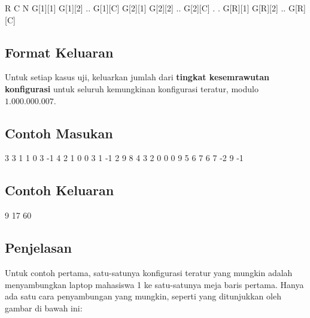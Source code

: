 \documentclass[../main_problemset.tex]{subfiles} %
\begin{document}
\begin{lcverbatim}
R C N
G[1][1] G[1][2] .. G[1][C]
G[2][1] G[2][2] .. G[2][C]
.
.
G[R][1] G[R][2] .. G[R][C]
\end{lcverbatim}

\subsection*{Format Keluaran}

Untuk setiap kasus uji, keluarkan jumlah dari \textbf{tingkat kesemrawutan konfigurasi} untuk seluruh kemungkinan konfigurasi teratur, modulo $ 1.000.000.007 $.

\vspace{.4cm}

\begin{minipage}[t]{0.5\textwidth}
\subsection*{Contoh Masukan}

\begin{lcverbatim}
3
3 1 1
0
3
-1
4 2 1
0 0
3 1
-1 2
9 8
4 3 2
0 0 0
9 5 6
7 6 7
-2 9 -1
\end{lcverbatim}
\end{minipage}
\begin{minipage}[t]{0.5\textwidth}
\subsection*{Contoh Keluaran}

\begin{lcverbatim}
9
17
60
\end{lcverbatim}
\end{minipage}

\subsection*{Penjelasan}

Untuk contoh pertama, satu-satunya konfigurasi teratur yang mungkin adalah menyambungkan laptop mahasiswa 1 ke satu-satunya meja baris pertama. Hanya ada satu cara penyambungan yang mungkin, seperti yang ditunjukkan oleh gambar di bawah ini:
\end{document}
